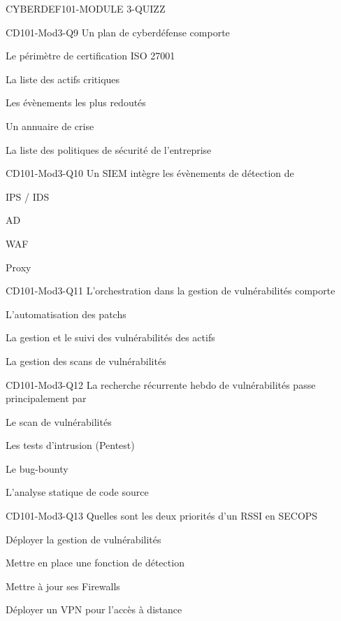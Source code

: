 \documentclass[12pt]{article}
\begin{document}
\begin{quiz}{CYBERDEF101-MODULE 3-QUIZZ}
\begin{multi}[multiple=true]{CD101-Mod3-Q9}
Un plan de cyberd\'efense comporte
\item Le p\'erim\`etre de certification ISO 27001
\item* La liste des actifs critiques
\item* Les \'ev\`enements les plus redout\'es
\item* Un annuaire de crise
\item La liste des politiques de s\'ecurit\'e de l'entreprise 
\end{multi}


\begin{multi}[multiple=true]{CD101-Mod3-Q10}
Un SIEM int\`egre les \'ev\`enements de d\'etection de
\item* IPS / IDS
\item AD
\item* WAF
\item* Proxy
\end{multi}

\begin{multi}[multiple=true]{CD101-Mod3-Q11}
L'orchestration dans la gestion de vuln\'erabilit\'es comporte
\item L'automatisation des patchs 
\item* La gestion et le suivi des vuln\'erabilit\'es des actifs
\item* La gestion des scans de vuln\'erabilit\'es
\end{multi}

\begin{multi}[multiple=true]{CD101-Mod3-Q12}
La recherche r\'ecurrente hebdo de vuln\'erabilit\'es passe principalement par
\item* Le scan de vuln\'erabilit\'es
\item Les tests d'intrusion (Pentest)
\item Le bug-bounty
\item* L'analyse statique de code source
\end{multi}

\begin{multi}[multiple=true]{CD101-Mod3-Q13}
 Quelles sont les deux priorit\'es d'un RSSI en SECOPS
\item* D\'eployer la gestion de vuln\'erabilit\'es
\item* Mettre en place une fonction de d\'etection
\item Mettre \`a jour ses Firewalls
\item D\'eployer un VPN pour l'acc\`es \`a distance
\end{multi}


\end{quiz}
\end{document}
